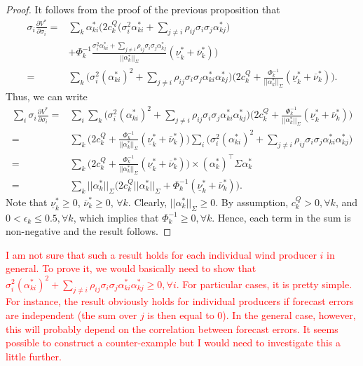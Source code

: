 \documentclass{article}
\begin{document}
\begin{proof}
It follows from the proof of the previous proposition that
\begin{align*}
\sigma_i \frac{\partial V^*}{\partial \sigma_i} =& \sum_k\alpha_{ki}^*\Big(2c_k^Q\big(\sigma_i^2 \alpha_{ki}^* + \sum_{j \ne i} \rho_{ij} \sigma_i \sigma_j\alpha_{kj}^*\big)\\
&+ \Phi_k^{-1} \frac{\sigma_i^2 \alpha_{ki}^* + \sum_{j \ne i} \rho_{ij} \sigma_i \sigma_j \alpha_{kj}^*}{||\alpha_k^*||_{\Sigma}}(\underline{\nu}_k^* + \overline{\nu}_k^*)\Big)\\
=&  \sum_k\Big(\sigma_i^2 (\alpha_{ki}^*)^2 + \sum_{j \ne i} \rho_{ij} \sigma_i \sigma_j\alpha_{ki}^* \alpha_{kj}^*\Big)\Big(2c_k^Q + \frac{\Phi_k^{-1}}{||\alpha_k^*||_{\Sigma}}(\underline{\nu}_k^* + \overline{\nu}_k^*)\Big).
\end{align*}
Thus, we can write
\begin{align*}
\sum_i \sigma_i \frac{\partial V^*}{\partial \sigma_i} =& \sum_i \sum_k \Big(\sigma_i^2 (\alpha_{ki}^*)^2 + \sum_{j \ne i} \rho_{ij} \sigma_i \sigma_j\alpha_{ki}^* \alpha_{kj}^*\Big) \Big(2c_k^Q + \frac{\Phi_k^{-1}}{||\alpha_k^*||_{\Sigma}}(\underline{\nu}_k^* + \overline{\nu}_k^*)\Big)\\
=& \sum_k \Big(2c_k^Q + \frac{\Phi_k^{-1}}{||\alpha_k^*||_{\Sigma}}(\underline{\nu}_k^* + \overline{\nu}_k^*)\Big) \sum_i \Big(\sigma_i^2 (\alpha_{ki}^*)^2 + \sum_{j \ne i} \rho_{ij} \sigma_i \sigma_j\alpha_{ki}^* \alpha_{kj}^*\Big)\\
=& \sum_k \Big(2c_k^Q + \frac{\Phi_k^{-1}}{||\alpha_k^*||_{\Sigma}}(\underline{\nu}_k^* + \overline{\nu}_k^*)\Big) \times(\alpha_k^*)^\top \Sigma \alpha_k^*\\
=& \sum_k ||\alpha_k^*||_{\Sigma} \Big(2c_k^Q ||\alpha_k^*||_{\Sigma} + \Phi_k^{-1} (\underline{\nu}_k^* + \overline{\nu}_k^*)\Big).
\end{align*}
Note that $\underline{\nu}_k^* \ge 0$, $\overline{\nu}_k^* \ge 0$, $\forall k$. Clearly, $||\alpha_k^*||_{\Sigma} \ge 0$. By assumption, $c_k^Q > 0, \forall k$, and $0 < \epsilon_k \le 0.5, \forall k$, which implies that $\Phi^{-1}_k \ge 0, \forall k$. Hence, each term in the sum is non-negative and the result follows.
\end{proof}

\textcolor{red}{I am not sure that such a result holds for each individual wind producer $i$ in general. To prove it, we would basically need to show that $\sigma_i^2 (\alpha_{ki}^*)^2 + \sum_{j \ne i} \rho_{ij} \sigma_i \sigma_j \alpha_{ki}^* \alpha_{kj}^* \ge 0, \forall i$. For particular cases, it is pretty simple. For instance, the result obviously holds for individual producers if forecast errors are independent (the sum over $j$ is then equal to 0). In the general case, however, this will probably depend on the correlation between forecast errors. It seems possible to construct a counter-example but I would need to investigate this a little further.}
\end{document}
